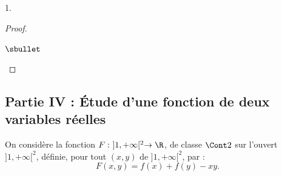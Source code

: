 \begin{noliste}{1.}
\begin{proof}
\begin{noliste}{$\sbullet$}
~\\[-1.4cm]
\end{noliste}
\end{proof}
\end{noliste}

\newpage

\subsection*{Partie IV : Étude d'une fonction de deux variables
  réelles}

\noindent
On considère la fonction $F: \ ]1,+\infty[^2 \rightarrow \R$, de classe 
$\Cont 2$ sur l'ouvert $]1,+\infty[^2$, définie, pour tout $(x,y)$ de 
$]1,+\infty[^2$, par :
\[
F(x,y)=f(x)+f(y)-xy.
\]
